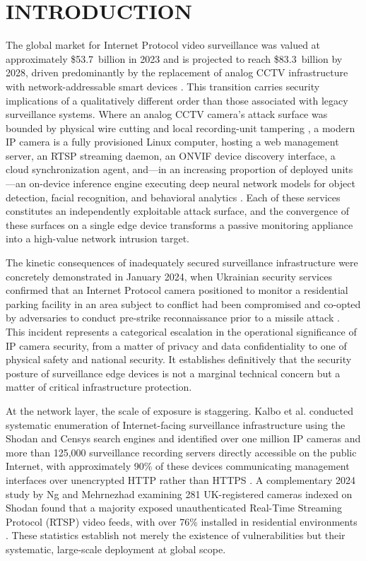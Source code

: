 \documentclass[letterpaper, 10pt, conference]{ieeeconf}
\begin{document}
\section{INTRODUCTION}

The global market for Internet Protocol video surveillance was valued at
approximately \$53.7~billion in 2023 and is projected to reach
\$83.3~billion by 2028, driven predominantly by the replacement of analog
CCTV infrastructure with network-addressable smart devices \cite{kalbo2020}.
This transition carries security implications of a qualitatively different
order than those associated with legacy surveillance systems. Where an
analog CCTV camera's attack surface was bounded by physical wire cutting
and local recording-unit tampering \cite{kalbo2020}, a modern IP camera
is a fully provisioned Linux computer, hosting a web management server,
an RTSP streaming daemon, an ONVIF device discovery interface,
a cloud synchronization agent, and---in an increasing proportion of
deployed units---an on-device inference engine executing deep neural
network models for object detection, facial recognition, and behavioral
analytics \cite{jin2022edge}. Each of these services constitutes an
independently exploitable attack surface, and the convergence of these
surfaces on a single edge device transforms a passive monitoring
appliance into a high-value network intrusion target.

The kinetic consequences of inadequately secured surveillance
infrastructure were concretely demonstrated in January 2024, when
Ukrainian security services confirmed that an Internet Protocol camera
positioned to monitor a residential parking facility in an area
subject to conflict had been compromised and co-opted by adversaries
to conduct pre-strike reconnaissance prior to a missile attack
\cite{asimily2024}. This incident represents a categorical escalation
in the operational significance of IP camera security, from a matter
of privacy and data confidentiality to one of physical safety and
national security. It establishes definitively that the security
posture of surveillance edge devices is not a marginal technical
concern but a matter of critical infrastructure protection.

At the network layer, the scale of exposure is staggering. Kalbo et al.
conducted systematic enumeration of Internet-facing surveillance
infrastructure using the Shodan and Censys search engines and identified
over one million IP cameras and more than 125,000 surveillance recording
servers directly accessible on the public Internet, with approximately
90\% of these devices communicating management interfaces over unencrypted
HTTP rather than HTTPS \cite{kalbo2020}. A complementary 2024 study by
Ng and Mehrnezhad examining 281 UK-registered cameras indexed on Shodan
found that a majority exposed unauthenticated Real-Time Streaming Protocol
(RTSP) video feeds, with over 76\% installed in residential environments
\cite{ng2024shodan}. These statistics establish not merely the existence
of vulnerabilities but their systematic, large-scale deployment at
global scope.
\end{document}

